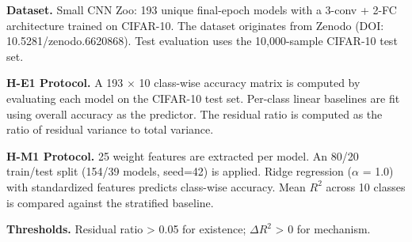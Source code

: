 
\textbf{Dataset.} Small CNN Zoo: 193 unique final-epoch models with a 3-conv + 2-FC architecture trained on CIFAR-10. The dataset originates from Zenodo (DOI: 10.5281/zenodo.6620868). Test evaluation uses the 10,000-sample CIFAR-10 test set.

\textbf{H-E1 Protocol.} A 193 $\times$ 10 class-wise accuracy matrix is computed by evaluating each model on the CIFAR-10 test set. Per-class linear baselines are fit using overall accuracy as the predictor. The residual ratio is computed as the ratio of residual variance to total variance.

\textbf{H-M1 Protocol.} 25 weight features are extracted per model. An 80/20 train/test split (154/39 models, seed=42) is applied. Ridge regression ($\alpha$ = 1.0) with standardized features predicts class-wise accuracy. Mean $R^2$ across 10 classes is compared against the stratified baseline.

\textbf{Thresholds.} Residual ratio > 0.05 for existence; $\Delta R^2$ > 0 for mechanism.
